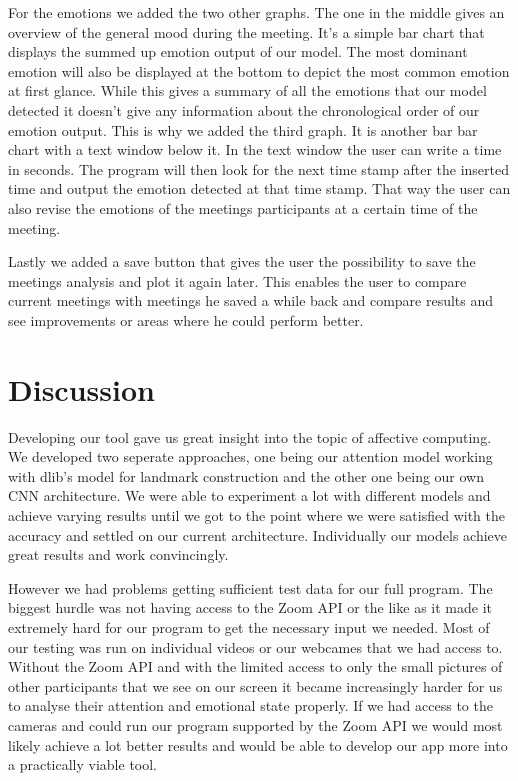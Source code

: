\documentclass{article}
\begin{document}
For the emotions we added the two other graphs. The one in the middle gives an overview of the general mood during the meeting. It's a simple bar chart that displays the summed up emotion output of our model. The most dominant emotion will also be displayed at the bottom to depict the most common emotion at first glance. While this gives a summary of all the emotions that our model detected it doesn't give any information about the chronological order of our emotion output. This is why we added the third graph. It is another bar bar chart with a text window below it. In the text window the user can write a time in seconds. The program will then look for the next time stamp after the inserted time and output the emotion detected at that time stamp. That way the user can also revise the emotions of the meetings participants at a certain time of the meeting. 

Lastly we added a save button that gives the user the possibility to save the meetings analysis and plot it again later. This enables the user to compare current meetings with meetings he saved a while back and compare results and see improvements or areas where he could perform better. 

\section{Discussion}

Developing our tool gave us great insight into the topic of affective computing. We developed two seperate approaches, one being our attention model working with dlib's model for landmark construction and the other one being our own CNN architecture. We were able to experiment a lot with different models and achieve varying results until we got to the point where we were satisfied with the accuracy and settled on our current architecture. Individually our models achieve great results and work convincingly. 

However we had problems getting sufficient test data for our full program. The biggest hurdle was not having access to the Zoom API or the like as it made it extremely hard for our program to get the necessary input we needed. Most of our testing was run on individual videos or our webcames that we had access to. Without the Zoom API and with the limited access to only the small pictures of other participants that we see on our screen it became increasingly harder for us to analyse their attention and emotional state properly. If we had access to the cameras and could run our program supported by the Zoom API we would most likely achieve a lot better results and would be able to develop our app more into a practically viable tool. 
\end{document}
